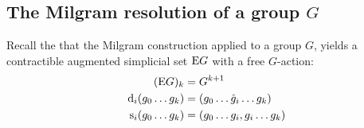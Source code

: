 %

\subsection{The Milgram resolution of a group \texorpdfstring{$G$}{G}}

Recall the that the Milgram construction applied to a group $G$, yields a contractible augmented simplicial set $\mathrm{E}G$ with a free $G$-action:
\begin{align*}
	(\mathrm{E}G)_k &= G^{k+1}\\
	\operatorname{d}_i(g_0\dots g_k) &= (g_0\dots\hat{g}_i\dots g_k) \\
	\operatorname{s}_i(g_0\dots g_k) &= (g_0\dots g_i,g_i\dots g_k)
\end{align*}
